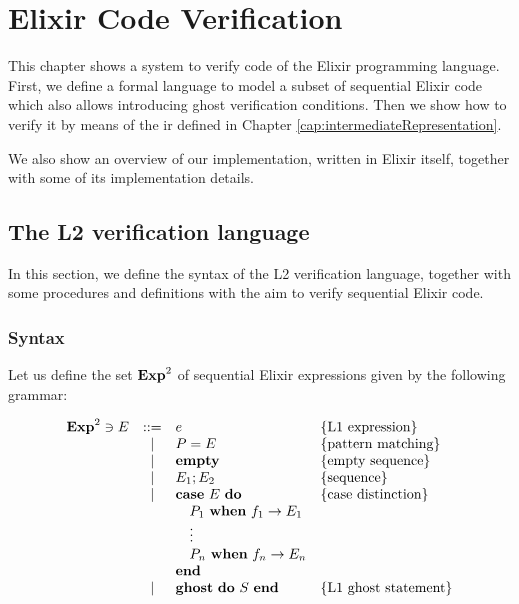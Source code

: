 \chapter{Elixir Code Verification}
\label{cap:elixirCodeVerification}


This chapter shows a system to verify code of the Elixir programming language.
First, we define a formal language to model a subset of sequential Elixir code
which also allows introducing ghost verification conditions. Then we show how to
verify it by means of the \gls{ir} defined in Chapter
\ref{cap:intermediateRepresentation}.

We also show an overview of our implementation, written in Elixir itself,
together with some of its implementation details.

\section{The L2 verification language}

In this section, we define the syntax of the L2 verification language, together
with some procedures and definitions with the aim to verify sequential Elixir
code.

\subsection{Syntax}

Let us define the set $\mathbf{Exp}^{2}$ of sequential Elixir expressions given by the 
following grammar:

\[
\begin{array}{rcll}
\mathbf{Exp}^{2} \ni E & ::= & e & \{ \textrm{L1 expression} \} \\
& | & P = E & \{ \textrm{pattern matching} \} \\
& | & \textbf{empty} & \{ \textrm{empty sequence} \} \\
& | & E_1; E_2 & \{ \textrm{sequence} \} \\
& | & \textbf{case}~E~\textbf{do} & \{ \textrm{case distinction} \} \\
& & \quad P_1~\textbf{when}~f_1 \rightarrow E_1 \\
& & \quad \vdots\\
& & \quad P_n~\textbf{when}~f_n \rightarrow E_n \\
& & \textbf{end} \\
& | & \textbf{ghost}~\textbf{do}~S~\textbf{end} & \{ \textrm{L1 ghost statement} \} \\
\end{array}
\]

